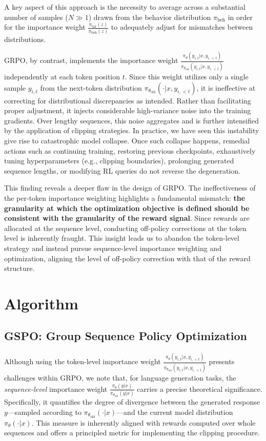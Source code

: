 A key aspect of this approach is the necessity to average across a substantial number of samples ($N \gg 1$) drawn from the behavior distribution $\pi_\text{beh}$ in order for the importance weight $\frac{ \pi_\text{tar} (z) }{ \pi_\text{beh} (z)}$ to adequately adjust for mismatches between distributions.

GRPO, by contrast, implements the importance weight $\frac{ \pi_{\theta} (y_{i,t} | x, y_{i,<t}) }{ \pi_{\theta_\text{old}} (y_{i,t} | x,y_{i,<t})}$ independently at each token position $t$. Since this weight utilizes only a single sample $y_{i,t}$ from the next-token distribution $\pi_{\theta_\text{old}}( \cdot | x, y_{i,<t})$, it is ineffective at correcting for distributional discrepancies as intended. Rather than facilitating proper adjustment, it injects considerable high-variance noise into the training gradients. Over lengthy sequences, this noise aggregates and is further intensified by the application of clipping strategies. In practice, we have seen this instability give rise to catastrophic model collapse. Once such collapse happens, remedial actions such as continuing training, restoring previous checkpoints, exhaustively tuning hyperparameters (e.g., clipping boundaries), prolonging generated sequence lengths, or modifying RL queries do not reverse the degeneration.

This finding reveals a deeper flaw in the design of GRPO. The ineffectiveness of the per-token importance weighting highlights a fundamental mismatch: \textbf{the granularity at which the optimization objective is defined should be consistent with the granularity of the reward signal}. Since rewards are allocated at the sequence level, conducting off-policy corrections at the token level is inherently fraught. This insight leads us to abandon the token-level strategy and instead pursue sequence-level importance weighting and optimization, aligning the level of off-policy correction with that of the reward structure.

\section{Algorithm}

\subsection{GSPO: Group Sequence Policy Optimization}

Although using the token-level importance weight $\frac{ \pi_{\theta} (y_{i,t} | x, y_{i,<t}) }{ \pi_{\theta_\text{old}} (y_{i,t} | x,y_{i,<t})}$ presents challenges within GRPO, we note that, for language generation tasks, the \textit{sequence-level} importance weight $\frac{ \pi_{\theta} (y | x) }{ \pi_{\theta_\text{old}} (y | x)}$ carries a precise theoretical significance. Specifically, it quantifies the degree of divergence between the generated response $y$—sampled according to $\pi_{\theta_\text{old}} (\cdot | x)$—and the current model distribution $\pi_{\theta} (\cdot | x)$. This measure is inherently aligned with rewards computed over whole sequences and offers a principled metric for implementing the clipping procedure.

